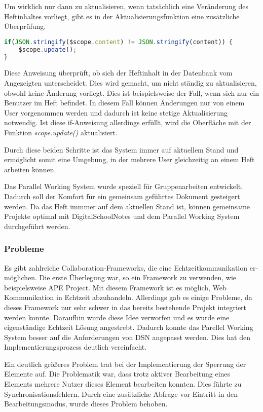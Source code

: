 \newpage

Um wirklich nur dann zu aktualisieren, wenn tatsächlich eine Veränderung des Heftinhaltes vorliegt, gibt es in der Aktualisierungsfunktion eine zusätzliche Überprüfung. 
\begin{lstlisting}[caption={Synchronisation - PWS}, language=Javascript]
if(JSON.stringify($scope.content) != JSON.stringify(content)) {
	$scope.update();
}
\end{lstlisting}
Diese Anweisung überprüft, ob sich der Heftinhalt in der Datenbank vom Angezeigten unterscheidet. Dies wird gemacht, um nicht ständig zu aktualisieren, obwohl keine Änderung vorliegt. Dies ist beispielsweise der Fall, wenn sich nur ein Benutzer im Heft befindet. In diesem Fall können Änderungen nur von einem User vorgenommen werden und dadurch ist keine stetige Aktualisierung notwendig. Ist diese if-Anweisung allerdings erfüllt, wird die Oberfläche mit der Funktion \textit{scope.update()} aktualisiert.

Durch diese beiden Schritte ist das System immer auf aktuellem Stand und ermöglicht somit eine Umgebung, in der mehrere User gleichzeitig an einem Heft arbeiten können.

Das Parallel Working System wurde speziell für Gruppenarbeiten entwickelt. Dadurch soll der Komfort für ein gemeinsam geführtes Dokument gesteigert werden. Da das Heft immmer auf dem aktuellen Stand ist, können gemeinsame Projekte optimal mit DigitalSchoolNotes und dem Parallel Working System  durchgeführt werden. 
 
\subsubsection{Probleme}
Es gibt zahlreiche Collaboration-Frameworks, die eine Echtzeitkommunikation er-\\möglichen. Die erste Überlegung war, so ein Framework zu verwenden, wie beispielsweise APE Project\cite{APE}. Mit diesem Framework ist es möglich, Web Kommunikation in Echtzeit abzuhandeln. Allerdings gab es einige Probleme, da dieses Framework nur sehr schwer in das bereits bestehende Projekt integriert werden konnte. Daraufhin wurde diese Idee verworfen und es wurde eine eigenständige Echtzeit Lösung angestrebt. Dadurch konnte das Parellel Working System besser auf die Anforderungen von DSN angepasst werden. Dies hat den Implementierungsprozess deutlich vereinfacht.

Ein deutlich größeres Problem trat bei der Implementierung der Sperrung der Elemente auf. Die Problematik war, dass trotz aktiver Bearbeitung eines Elements mehrere Nutzer dieses Element bearbeiten konnten. Dies führte zu Synchronisationsfehlern. Durch eine zusätzliche Abfrage vor Eintritt in den Bearbeitungsmodus, wurde dieses Problem behoben. 


